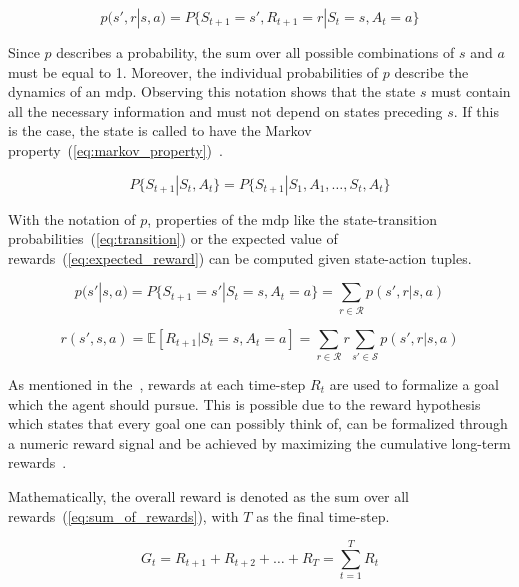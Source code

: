 \documentclass[draft,final]{vutinfth} %
\newcommand{\pautoref}[1]{(\autoref{#1})}
\newcommand{\p}[1]{see p. #1}
\begin{document}
    \begin{equation}
        p(s',r|s,a) = P\{S_{t+1}=s', R_{t+1}=r | S_t=s, A_t=a\}\label{eq:distribution}
    \end{equation}

    Since $p$ describes a probability, the sum over all possible combinations of $s$ and $a$ must be equal to 1.
    Moreover, the individual probabilities of $p$ describe the dynamics of an \gls{mdp}.
    Observing this notation shows that the state $s$ must contain all the necessary information and must not depend on states preceding $s$.
    If this is the case, the state is called to have the Markov property~\pautoref{eq:markov_property}~\citep{francois-lavet_introduction_2018}.

    \begin{equation}
        P\{S_{t+1}|S_t,A_t\} = P\{S_{t+1}|S_1,A_1,\ldots,S_t,A_t\} \label{eq:markov_property}
    \end{equation}

    With the notation of $p$, properties of the \gls{mdp} like the state-transition probabilities~\pautoref{eq:transition} or the expected value of rewards~\pautoref{eq:expected_reward} can be computed given state-action tuples.

    \begin{equation}
        p(s'|s,a) = P\{S_{t+1}=s'| S_t=s, A_t=a\} = \sum_{r \in \mathcal{R}} p(s',r | s,a) \label{eq:transition}
    \end{equation}

    \begin{equation}
        r(s',s,a) = \mathbb{E}[R_{t+1} | S_t=s, A_t=a] = \sum_{r\in \mathcal{R}} r \sum_{s' \in \mathcal{S}} p(s',r | s,a) \label{eq:expected_reward}
    \end{equation}

    As mentioned in the~, rewards at each time-step $R_t$ are used to formalize a goal which the agent should pursue.
    This is possible due to the reward hypothesis which states that every goal one can possibly think of, can be formalized through a numeric reward signal and be achieved by maximizing the cumulative long-term rewards~\citep[\p{53}]{sutton_reinforcement_2018}.

    Mathematically, the overall reward is denoted as the sum over all rewards~\pautoref{eq:sum_of_rewards}, with $T$ as the final time-step.

    \begin{equation}
        G_t=R_{t+1} + R_{t+2}+ \ldots + R_{T}  =\sum_{t=1}^{T} R_{t}\label{eq:sum_of_rewards}
    \end{equation}
\end{document}
